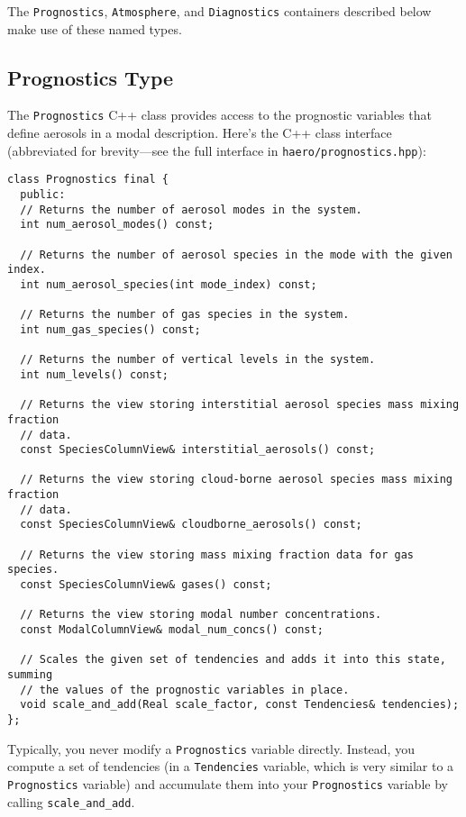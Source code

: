 The \texttt{Prognostics}, \texttt{Atmosphere}, and \texttt{Diagnostics} containers
described below make use of these named types.

\subsection{Prognostics Type}

The \texttt{Prognostics} C++ class provides access to the prognostic variables
that define aerosols in a modal description. Here's the C++ class interface
(abbreviated for brevity---see the full interface in \texttt{haero/prognostics.hpp}):

\begin{lstlisting}
class Prognostics final {
  public:
  // Returns the number of aerosol modes in the system.
  int num_aerosol_modes() const;

  // Returns the number of aerosol species in the mode with the given index.
  int num_aerosol_species(int mode_index) const;

  // Returns the number of gas species in the system.
  int num_gas_species() const;

  // Returns the number of vertical levels in the system.
  int num_levels() const;

  // Returns the view storing interstitial aerosol species mass mixing fraction
  // data.
  const SpeciesColumnView& interstitial_aerosols() const;

  // Returns the view storing cloud-borne aerosol species mass mixing fraction
  // data.
  const SpeciesColumnView& cloudborne_aerosols() const;

  // Returns the view storing mass mixing fraction data for gas species.
  const SpeciesColumnView& gases() const;

  // Returns the view storing modal number concentrations.
  const ModalColumnView& modal_num_concs() const;

  // Scales the given set of tendencies and adds it into this state, summing
  // the values of the prognostic variables in place.
  void scale_and_add(Real scale_factor, const Tendencies& tendencies);
};
\end{lstlisting}

Typically, you never modify a \texttt{Prognostics} variable directly. Instead, you
compute a set of tendencies (in a \texttt{Tendencies} variable, which is very
similar to a \texttt{Prognostics} variable) and accumulate them into your
\texttt{Prognostics} variable by calling \texttt{scale\_and\_add}.

